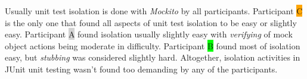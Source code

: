 Usually unit test isolation is done with \textit{Mockito} by all participants. Participant {\colorbox{orange}C} is the only
one that found all aspects of unit test isolation to be easy or slightly easy. Participant {\colorbox{lightgray}A} found isolation
usually slightly easy with \textit{verifying} of mock object actions being moderate in difficulty. Participant {\colorbox{lime}B}
found most of isolation easy, but \textit{stubbing} was considered slightly hard. Altogether, isolation activities in JUnit unit testing
wasn't found too demanding by any of the participants.

    \begin{table}[H]
\end{table}
